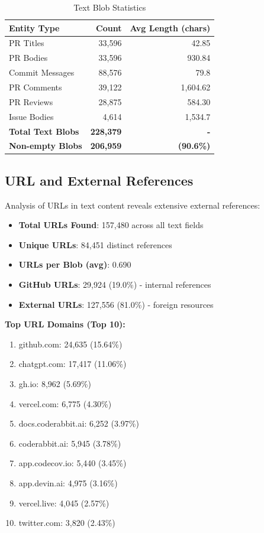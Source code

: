\documentclass[11pt]{article}
\begin{document}
\begin{table}[H]
\centering
\caption{Text Blob Statistics}
\label{tab:text_blobs}
\begin{tabular}{@{}lrr@{}}
\toprule
\textbf{Entity Type} & \textbf{Count} & \textbf{Avg Length (chars)} \\
\midrule
PR Titles & 33,596 & 42.85 \\
PR Bodies & 33,596 & 930.84 \\
Commit Messages & 88,576 & 79.8 \\
PR Comments & 39,122 & 1,604.62 \\
PR Reviews & 28,875 & 584.30 \\
Issue Bodies & 4,614 & 1,534.7 \\
\midrule
\textbf{Total Text Blobs} & \textbf{228,379} & \textbf{-} \\
\textbf{Non-empty Blobs} & \textbf{206,959} & \textbf{(90.6\%)} \\
\bottomrule
\end{tabular}
\end{table}

\subsection{URL and External References}

Analysis of URLs in text content reveals extensive external references:

\begin{itemize}
    \item \textbf{Total URLs Found}: 157,480 across all text fields
    \item \textbf{Unique URLs}: 84,451 distinct references
    \item \textbf{URLs per Blob (avg)}: 0.690
    \item \textbf{GitHub URLs}: 29,924 (19.0\%) - internal references
    \item \textbf{External URLs}: 127,556 (81.0\%) - foreign resources
\end{itemize}

\textbf{Top URL Domains (Top 10):}
\begin{enumerate}
    \item github.com: 24,635 (15.64\%)
    \item chatgpt.com: 17,417 (11.06\%)
    \item gh.io: 8,962 (5.69\%)
    \item vercel.com: 6,775 (4.30\%)
    \item docs.coderabbit.ai: 6,252 (3.97\%)
    \item coderabbit.ai: 5,945 (3.78\%)
    \item app.codecov.io: 5,440 (3.45\%)
    \item app.devin.ai: 4,975 (3.16\%)
    \item vercel.live: 4,045 (2.57\%)
    \item twitter.com: 3,820 (2.43\%)
\end{enumerate}
\end{document}

